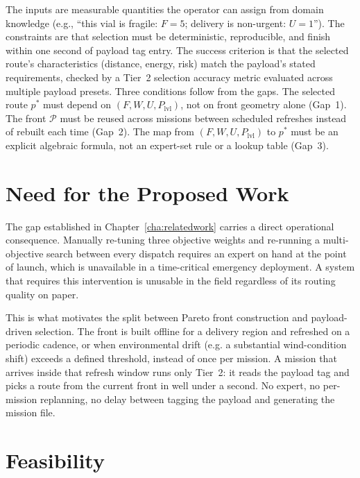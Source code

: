 \documentclass{ssnreview}
\newcommand{\flowchapter}[1]{\par\addvspace{30pt}{\let\clearpage\relax\chapter{#1}}}
\begin{document}
The inputs are measurable quantities the operator can assign from domain knowledge (e.g.,
``this vial is fragile: $F = 5$; delivery is non-urgent: $U = 1$''). The constraints are
that selection must be deterministic, reproducible, and finish within one second of
payload tag entry. The success criterion is that the selected route's characteristics
(distance, energy, risk) match the payload's stated requirements, checked by a Tier~2
selection accuracy metric evaluated across multiple payload presets. Three conditions
follow from the gaps. The selected route $p^*$ must depend on $(F, W, U, P_\mathrm{lvl})$,
not on front geometry alone (Gap~1). The front $\mathcal{P}$ must be reused across
missions between scheduled refreshes instead of rebuilt each time (Gap~2). The map from
$(F, W, U, P_\mathrm{lvl})$ to $p^*$ must be an explicit algebraic formula, not an
expert-set rule or a lookup table (Gap~3).

\flowchapter{Justification for the Problem Formulation}\label{cha:justification}

\section{Need for the Proposed Work}

The gap established in Chapter~\ref{cha:relatedwork} carries a direct operational
consequence. Manually re-tuning three objective weights and re-running a multi-objective
search between every dispatch requires an expert on hand at the point of launch, which is
unavailable in a time-critical emergency deployment. A system that requires this
intervention is unusable in the field regardless of its routing quality on paper.

This is what motivates the split between Pareto front construction and payload-driven
selection. The front is built offline for a delivery region and refreshed on a periodic
cadence, or when environmental drift (e.g. a substantial wind-condition shift) exceeds a
defined threshold, instead of once per mission. A mission that arrives inside that
refresh window runs only Tier~2: it reads the payload tag and picks a route from the
current front in well under a second. No expert, no per-mission replanning, no delay
between tagging the payload and generating the mission file.

\section{Feasibility}
\end{document}
